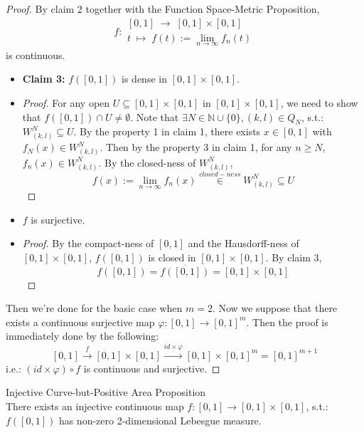 \begin{proof}
    By claim 2 together with the Function Space-Metric Proposition,
    $$f: \substack{[0,1] \;\to\; [0,1] \times [0,1]\\
    t \;\mapsto\; f(t):= \lim_{n\to \infty} f_n(t)}$$
    is continuous.

    \begin{itemize}
        \item \textbf{Claim 3:} $f([0,1])$ is dense in $[0,1] \times [0,1]$.
        \item \begin{proof}
            For any open $U \subseteq [0,1] \times [0,1]$ in $[0,1]\times [0,1]$, we need to show that $f([0,1]) \cap U \neq \emptyset$. Note that $\exists N \in \mathbb{N} \cup \{0\}, (k,l) \in Q_N$, s.t.: $W_{(k,l)}^N \subseteq U$. By the property 1 in claim 1, there exists $x \in [0,1]$ with $f_N (x) \in W_{(k,l)}^N$. Then by the property 3 in claim 1, for any $n \geq N$, $f_n (x) \in W_{(k,l)}^N$. By the closed-ness of $W_{(k,l)}^N$,
            $$f(x):= \lim_{n \to \infty} f_n(x) \overset{closed-ness}{\in} W_{(k,l)}^N \subseteq U$$
        \end{proof}

        \item $f$ is surjective.
        \item \begin{proof}
            By the compact-ness of $[0,1]$ and the Hausdorff-ness of $[0,1] \times [0,1]$, $f([0,1])$ is closed in $[0,1]\times [0,1]$. By claim 3,
            $$f([0,1]) =\overline{f([0,1])} = [0,1] \times [0,1]$$
        \end{proof}
    \end{itemize}
    Then we're done for the basic case when $m=2$. Now we suppose that there exists a continuous surjective map $\varphi: [0,1] \to [0,1] ^m$. Then the proof is immediately done by the following:
    $$[0,1] \overset{f}{\longrightarrow} [0,1] \times [0,1] \overset{id \times \varphi}{\longrightarrow} [0,1] \times [0,1]^m = [0,1]^{m+1}$$
    i.e.: $(id \times \varphi) \circ f$ is continuous and surjective.
\end{proof}

\begin{proposition}{Injective Curve-but-Positive Area Proposition}\\
There exists an injective continuous map $f:[0,1] \to [0,1] \times [0,1]$, s.t.: $f([0,1])$ has non-zero 2-dimensional Lebesgue measure.
\end{proposition}

